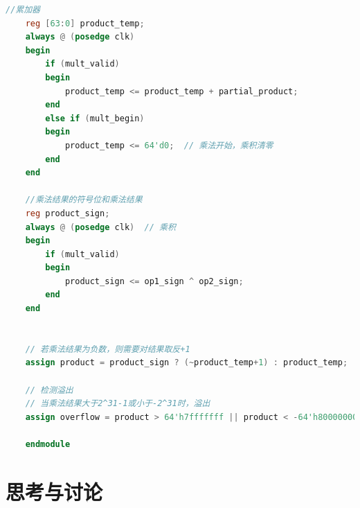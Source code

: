 \documentclass[AutoFakeBold]{LZUThesis}
\begin{document}
\begin{lstlisting}[language=Verilog]
    //累加器
    reg [63:0] product_temp;
    always @ (posedge clk)
    begin
        if (mult_valid)
        begin
            product_temp <= product_temp + partial_product;
        end
        else if (mult_begin) 
        begin
            product_temp <= 64'd0;  // 乘法开始，乘积清零 
        end
    end 
     
    //乘法结果的符号位和乘法结果
    reg product_sign;
    always @ (posedge clk)  // 乘积
    begin
        if (mult_valid)
        begin
            product_sign <= op1_sign ^ op2_sign;
        end
    end 
    

    // 若乘法结果为负数，则需要对结果取反+1
    assign product = product_sign ? (~product_temp+1) : product_temp;

    // 检测溢出
    // 当乘法结果大于2^31-1或小于-2^31时，溢出
    assign overflow = product > 64'h7fffffff || product < -64'h80000000;

    endmodule

\end{lstlisting}

\chapter{思考与讨论}
\end{document}
